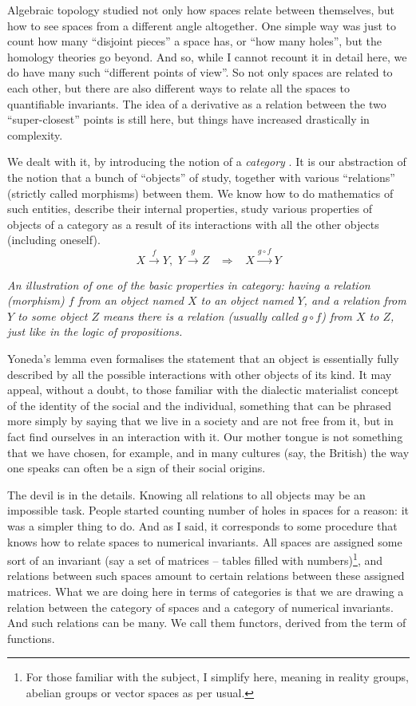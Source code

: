 \documentclass{article}
\begin{document}
Algebraic topology studied not only how spaces relate between themselves, but how to see spaces from a different angle altogether. One simple way was just to count how many “disjoint pieces” a space has, or “how many holes”, but the homology theories go beyond. And so, while I cannot recount it in detail here, we do have many such “different points of view”. So not only spaces are related to each other, but there are also different ways to relate all the spaces to quantifiable invariants. The idea of a derivative as a relation between the two “super-closest” points is still here, but things have increased drastically in complexity.

We dealt with it, by introducing the notion of a \emph{category} \cite{EILMAC,MACLANE}. It is our abstraction of the notion that a bunch of “objects” of study, together with various “relations” (strictly called morphisms) between them. We know how to do mathematics of such entities, describe their internal properties, study various properties of objects of a category as a result of its interactions with all the other objects (including oneself).
$$
X \stackrel f \longrightarrow Y, \, \, Y \stackrel g \longrightarrow Z \, \, \, \, \, \Rightarrow \, \, \, \, \, X \stackrel{g \circ f}{\longrightarrow} Y
$$
\begin{center}
\textit{An illustration of one of the basic properties in category: having a relation (morphism) $f$ from an object named $X$ to an object named $Y$, and a relation from $Y$ to some object $Z$ means there is a relation (usually called $g \circ f$) from $X$ to $Z$, just like in the logic of propositions.}
\end{center}


Yoneda’s lemma \cite{MACLANE} even formalises the statement that an object is essentially fully described by all the possible interactions with other objects of its kind. It may appeal, without a doubt, to those familiar with the dialectic materialist concept of the identity of the social and the individual, something that can be phrased more simply by saying that we live in a society and are not free from it, but in fact find ourselves in an interaction with it. Our mother tongue is not something that we have chosen, for example, and in many cultures (say, the British) the way one speaks can often be a sign of their social origins.

The devil is in the details. Knowing all relations to all objects may be an impossible task. People started counting number of holes in spaces for a reason: it was a simpler thing to do. And as I said, it corresponds to some procedure that knows how to relate spaces to numerical invariants. All spaces are assigned some sort of an invariant (say a set of matrices – tables filled with numbers)\footnote{For those familiar with the subject, I simplify here, meaning in reality groups, abelian groups or vector spaces as per usual.}, and relations between such spaces amount to certain relations between these assigned matrices. What we are doing here in terms of categories is that we are drawing a relation between the category of spaces and a category of numerical invariants. And such relations can be many. We call them functors, derived from the term of functions.
\end{document}
